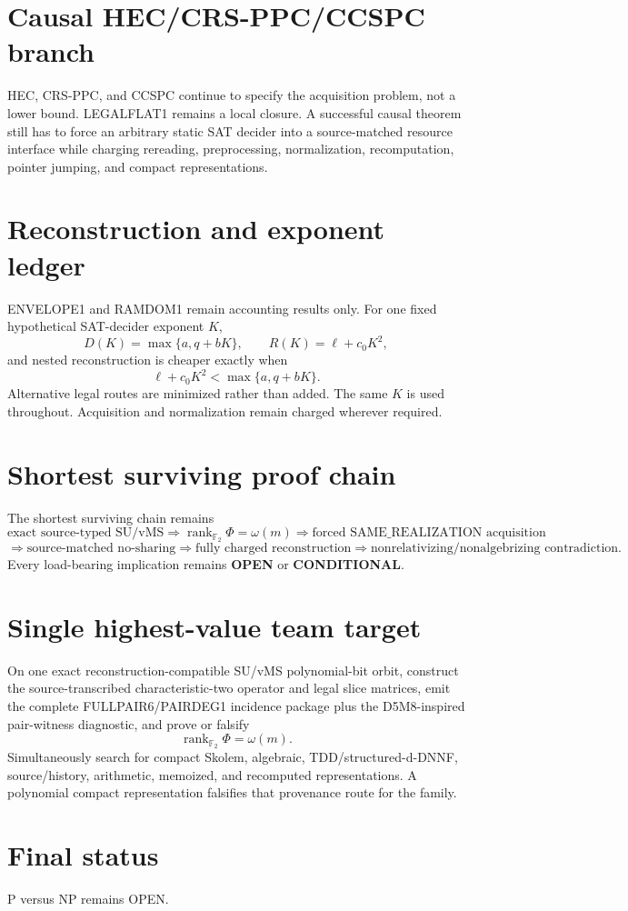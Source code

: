 \documentclass[11pt]{article}
\begin{document}
\section*{Causal HEC/CRS-PPC/CCSPC branch}
HEC, CRS-PPC, and CCSPC continue to specify the acquisition problem, not a lower bound. LEGALFLAT1 remains a local closure. A successful causal theorem still has to force an arbitrary static SAT decider into a source-matched resource interface while charging rereading, preprocessing, normalization, recomputation, pointer jumping, and compact representations.

\section*{Reconstruction and exponent ledger}
ENVELOPE1 and RAMDOM1 remain accounting results only. For one fixed hypothetical SAT-decider exponent \(K\),
\[
D(K)=\max\{a,q+bK\},\qquad
R(K)=\ell+c_0K^2,
\]
and nested reconstruction is cheaper exactly when
\[
\ell+c_0K^2<\max\{a,q+bK\}.
\]
Alternative legal routes are minimized rather than added. The same \(K\) is used throughout. Acquisition and normalization remain charged wherever required.

\section*{Shortest surviving proof chain}
The shortest surviving chain remains
\[
\text{exact source-typed SU/vMS}
\Longrightarrow
\operatorname{rank}_{\mathbb F_2}\Phi=\omega(m)
\Longrightarrow
\text{forced SAME\_REALIZATION acquisition}
\]
\[
\Longrightarrow
\text{source-matched no-sharing}
\Longrightarrow
\text{fully charged reconstruction}
\Longrightarrow
\text{nonrelativizing/nonalgebrizing contradiction}.
\]
Every load-bearing implication remains \textbf{OPEN} or \textbf{CONDITIONAL}.

\section*{Single highest-value team target}
On one exact reconstruction-compatible SU/vMS polynomial-bit orbit, construct the source-transcribed characteristic-two operator and legal slice matrices, emit the complete FULLPAIR6/PAIRDEG1 incidence package plus the D5M8-inspired pair-witness diagnostic, and prove or falsify
\[
\boxed{\operatorname{rank}_{\mathbb F_2}\Phi=\omega(m)}.
\]
Simultaneously search for compact Skolem, algebraic, TDD/structured-d-DNNF, source/history, arithmetic, memoized, and recomputed representations. A polynomial compact representation falsifies that provenance route for the family.

\section*{Final status}
P versus NP remains OPEN.

\end{document}
